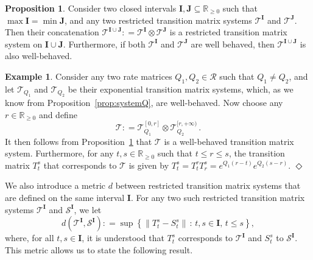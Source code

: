 \documentclass[10pt,a4paper]{paper}
\theoremstyle{definition}
\newtheorem{exmp}{Example}%
\newtheorem{proposition}[theorem]{Proposition}
\newcommand{\reals}{\mathbb{R}}
\newcommand{\realsnonneg}{\reals_{\geq 0}}
\newcommand{\norm}[1]{\left\lVert #1 \right\rVert}
\newcommand{\coloneqq}{:\!=}
\newcommand{\exampleend}{\hfill$\Diamond$}
\begin{document}
\begin{proposition}\label{prop:concat_restr_trans_mat_systems_is_system}
Consider two closed intervals $\mathbf{I},\mathbf{J}\subseteq\realsnonneg$ such that $\max\mathbf{I}=\min\mathbf{J}$, and any two restricted transition matrix systems $\mathcal{T}^{\mathbf{I}}$ and $\mathcal{T}^{\mathbf{J}}$. Then their concatenation $\mathcal{T}^{\mathbf{I}\cup \mathbf{J}} \coloneqq \mathcal{T}^{\mathbf{I}}\otimes \mathcal{T}^{\mathbf{J}}$ is a restricted transition matrix system on $\mathbf{I}\cup\mathbf{J}$. Furthermore, if both $\mathcal{T}^{\mathbf{I}}$ and $\mathcal{T}^{\mathbf{J}}$ are well behaved, then $\mathcal{T}^{\mathbf{I}\cup\mathbf{J}}$ is also well-behaved.
\end{proposition}

\begin{exmp}
Consider any two rate matrices $Q_1,Q_2\in\mathcal{R}$ such that $Q_1\neq Q_2$, and let $\mathcal{T}_{Q_1}$ and $\mathcal{T}_{Q_2}$ be their exponential transition matrix systems, which, as we know from Proposition~\ref{prop:systemQ}, are well-behaved. Now choose any $r\in\realsnonneg$ and define
\begin{equation*}
\mathcal{T} \coloneqq \mathcal{T}_{Q_1}^{[0,r]} \otimes \mathcal{T}_{Q_2}^{[r,+\infty)}\,.
\end{equation*}
It then follows from Proposition~\ref{prop:concat_restr_trans_mat_systems_is_system} that $\mathcal{T}$ is a well-behaved transition matrix system. Furthermore, for any $t,s\in\realsnonneg$ such that $t\leq r\leq s$, the transition matrix $T_t^s$ that corresponds to $\mathcal{T}$ is given by $T_t^s = T_t^rT_r^s = e^{Q_1(r-t)}e^{Q_2(s-r)}$.
\exampleend
\end{exmp}

We also introduce a metric $d$ between restricted transition matrix systems that are defined on the same interval $\mathbf{I}$. For any two such restricted transition matrix systems $\mathcal{T}^\mathbf{I}$ and $\mathcal{S}^\mathbf{I}$, we let
\begin{equation}\label{eq:trans_mat_system_metric}
d(\mathcal{T}^{\mathbf{I}},\mathcal{S}^{\mathbf{I}}) \coloneqq \sup\left\{\norm{T_t^s - S_t^s}\,:\,t,s\in\mathbf{I},\,t\leq s\right\},
\end{equation}
where, for all $t,s\in\mathbf{I}$, it is understood that $T_t^s$ corresponds to $\mathcal{T}^{\mathbf{I}}$ and $S_t^s$ to $\mathcal{S}^{\mathbf{I}}$. This metric allows us to state the following result.
\end{document}
